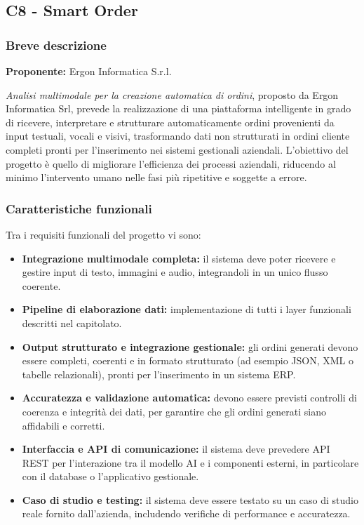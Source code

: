 \documentclass[a4paper,11pt]{article}
\begin{document}
\subsection{C8 - Smart Order}
\subsubsection{Breve descrizione}
\textbf{Proponente:} Ergon Informatica S.r.l.
\vspace{0.5em}\\
\parbox[h]{\linewidth}{%
\textit{Analisi multimodale per la creazione automatica di
ordini}, proposto da Ergon Informatica Srl, prevede la realizzazione di una
piattaforma intelligente in grado di ricevere, interpretare e strutturare
automaticamente ordini provenienti da input testuali, vocali e visivi, trasformando
dati non strutturati in ordini cliente completi pronti per l'inserimento nei sistemi
gestionali aziendali. L'obiettivo del progetto è quello di migliorare l'efficienza dei
processi aziendali, riducendo al minimo l'intervento umano nelle fasi più ripetitive
e soggette a errore.
}

\subsubsection{Caratteristiche funzionali}
Tra i requisiti funzionali del progetto vi sono:
\begin{itemize}
 \item \textbf{Integrazione multimodale completa:} il sistema deve poter ricevere e gestire input di testo, immagini e audio, integrandoli in un unico flusso coerente.
 \item \textbf{Pipeline di elaborazione dati:} implementazione di tutti i layer funzionali descritti nel capitolato.
 \item \textbf{Output strutturato e integrazione gestionale:} gli ordini generati devono essere completi, coerenti e in formato strutturato (ad esempio JSON, XML o tabelle relazionali), pronti per l'inserimento in un sistema ERP.
 \item \textbf{Accuratezza e validazione automatica:} devono essere previsti controlli di coerenza e integrità dei dati, per garantire che gli ordini generati siano affidabili e corretti.
 \item \textbf{Interfaccia e API di comunicazione:} il sistema deve prevedere API REST per l'interazione tra il modello AI e i componenti esterni, in particolare con il database o l'applicativo gestionale.
 \item \textbf{Caso di studio e testing:} il sistema deve essere testato su un caso di studio reale fornito dall'azienda, includendo verifiche di performance e accuratezza.
\end{itemize}
\end{document}

